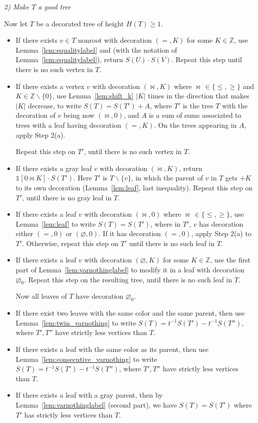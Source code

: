 \documentclass[12pt]{amsart}
\theoremstyle{plain}
\theoremstyle{remark}
\def\Z{\mathbb{Z}}
\begin{document}
\emph{2) Make $T$ a good tree}

Now let $T$ be a decorated tree of height $H(T) \geq 1$.
\begin{itemize}
\item[2(a)] If there exists $v \in T$ nonroot with decoration $(=,K)$ for some $K \in \Z$, use  Lemma~\ref{lem:equalitylabel} and (with the notation of Lemma~\ref{lem:equalitylabel}), return $S(U) \cdot S(V)$. Repeat this step until there is no such vertex in $T$.
\item[2(b)] If there exists a vertex $v$ with decoration $(\bowtie,K)$ where $\bowtie \, \in \{ \leq,\geq\}$ and $K \in \Z \backslash \{0\}$, use Lemma~\ref{lem:shift_k} $|K|$ times in the direction that makes $|K|$ decrease, to write $S(T)=S(T')+A$, where $T'$ is the tree $T$ with the decoration of $v$ being now $(\bowtie,0)$, and $A$ is a sum of sums associated to trees with a leaf having decoration $(=,K)$. On the trees appearing in $A$, apply Step 2(a). 

Repeat this step on $T'$, until there is no such vertex in $T$.
\item[2(c)] If there exists a gray leaf $v$ with decoration $(\bowtie,K)$, return $\mathds{1}[0 \bowtie K] \cdot S(T')$. Here $T'$ is $T \backslash \{v\}$, in which the parent of $v$ in $T$ gets $+K$ to its own decoration (Lemma~\ref{lem:leaf}, last inequality). Repeat this step on $T'$, until there is no gray leaf in $T$.
\item[2(d)] If there exists a leaf $v$ with decoration $(\bowtie,0)$ where $\bowtie \, \in \{ \leq,\geq\}$, use Lemma~\ref{lem:leaf} to write $S(T)=S(T')$, where in $T'$, $v$ has decoration either $(=,0)$ or $(\varnothing,0)$. If it has decoration $(=,0)$, apply Step 2(a) to $T'$. Otherwise, repeat this step on $T'$ until there is no such leaf in $T$.
\item[2(e)] If there exists a leaf $v$ with decoration $(\varnothing,K)$ for some $K \in \Z$, use the first part of Lemma~\ref{lem:varnothinglabel} to modify it in a leaf with decoration $\varnothing_0$. Repeat this step on the resulting tree, until there is no such leaf in $T$.
\smallskip

Now all leaves of $T$ have decoration $\varnothing_0$.

\item[2(f)] If there exist two leaves with the same color and the same parent, then use  Lemma~\ref{lem:twin_varnothing} to write $S(T)=t^{-1} S(T')-t^{-1} S(T'')$, where $T',T''$ have strictly less vertices than $T$.
\item[2(g)] If there exists a leaf with the same color as its parent, then use  Lemma~\ref{lem:consecutive_varnothing} to write $S(T)=t^{-1} S(T')-t^{-1} S(T'')$, where $T',T''$ have strictly less vertices than $T$.
\item[2(h)] If there exists a leaf with a gray parent, then by Lemma~\ref{lem:varnothinglabel} (second part), we have $S(T)=S(T')$ where $T'$ has strictly less vertices than $T$.
\end{itemize}
\end{document}
